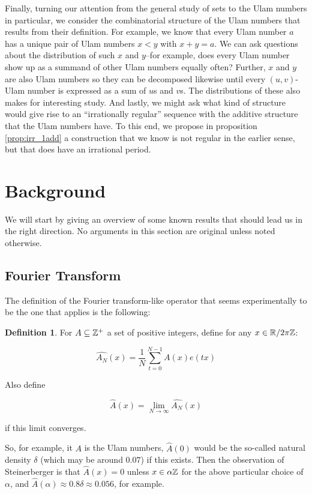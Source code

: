\documentclass{article}
\theoremstyle{definition}
\newtheorem{definition}{Definition}
\theoremstyle{remark}
\numberwithin{equation}{section}
\begin{document}
Finally, turning our attention from the general study of \relevant
sets to the Ulam numbers in particular, we consider the combinatorial
structure of the Ulam numbers that results from their definition.  For
example, we know that every Ulam number $a$ has a unique pair of Ulam
numbers $x < y$ with $x + y = a$.  We can ask questions about the
distribution of such $x$ and $y$--for example, does every Ulam number
show up as a summand of other Ulam numbers equally often?  Further,
$x$ and $y$ are also Ulam numbers so they can be decomposed likewise
until every $(u,v)$-Ulam number is expressed as a sum of $u$s and
$v$s.  The distributions of these also makes for interesting study.
And lastly, we might ask what kind of structure would give rise to an
``irrationally regular'' sequence with the additive structure that the
Ulam numbers have.  To this end, we propose in proposition
\ref{prop:irr_1add} a construction that we know is not regular in the
earlier sense, but that does have an irrational period.

\section{Background}

We will start by giving an overview of some known results that should
lead us in the right direction.  No arguments in this section are
original unless noted otherwise.

\subsection{Fourier Transform}

The definition of the Fourier transform-like operator that seems
experimentally to be the one that applies is the following:

\begin{definition}
For $A \subseteq \mathbb{Z}^+$ a set of positive integers, define for any
$x\in \mathbb{R}/2\pi\mathbb{Z}$: 

\[\widehat{A_N}(x) = \frac{1}{N} \sum_{t=0}^{N-1} A(x) e(tx)\]

Also define 

\[\widehat{A}(x) = \lim_{N \to \infty} \widehat{A_N}(x)\]

if this limit converges.  
\end{definition}

So, for example, it $A$ is the Ulam numbers, $\widehat{A}(0)$ would be
the so-called natural density $\delta$ (which may be around $0.07$) if
this exists.  Then the observation of Steinerberger is that
$\widehat{A}(x) = 0$ unless $x \in \alpha\mathbb{Z}$ for the above particular
choice of $\alpha$, and
$\widehat{A}(\alpha) \approx 0.8\delta \approx 0.056$, for example.
\end{document}
